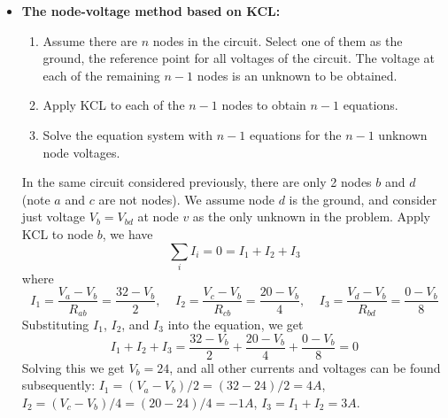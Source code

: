\begin{itemize}
\begin{itemize}
  \item Alternatively, consider the two loop currents $I_a$ and $I_c$ 
    around loops abda and bcdb:
    \begin{eqnarray}
      \sum V_{abda}&=&-32+2(I_a+I_c)+8I_a=0\nonumber\\
      \sum V_{abcda}&=&-32+2(I_a+I_c)+4I_c+20=0\nonumber
    \end{eqnarray}
    i.e.,
    \[
    \left\{ \begin{array}{rrrr} 10I_a&+2I_c&=&32 \\ 2I_a &+6I_c&=&12
    \end{array} \right. 
    \begin{comment}
    \;\;\;\;\;\mbox{i.e.,}\;\;\;\;\;\;
    \left\{ \begin{array}{rrrr} 5I_a&+I_c&=&16 \\ I_a &+3I_c&=&6\end{array} \right. 
    \end{comment}
    \;\;\;\;\;\;\Longrightarrow \;\;\;\;\;
    \left\{ \begin{array}{l}
      I_a=3 \\  I_c=1 \end{array} \right. 
    \]
    and we get $I_1=I_a+I_c=4$ and $I_2=-I_c=-1$, same as the previous 
    results.

  \end{itemize}

\item {\bf The node-voltage method based on KCL:}

  \begin{enumerate} 
  \item Assume there are $n$ nodes in the circuit. Select one of them as
    the ground, the reference point for all voltages of the circuit.
    The voltage at each of the remaining $n-1$ nodes is an unknown to be 
    obtained.
  \item Apply KCL to each of the $n-1$ nodes to obtain $n-1$ equations. 
  \item Solve the equation system with $n-1$ equations for the $n-1$
    unknown node voltages.
  \end{enumerate}


  In the same circuit considered previously, there are only 2 nodes $b$ and
  $d$ (note $a$ and $c$ are not nodes). We assume node $d$ is the ground,
  and consider just voltage $V_b=V_{bd}$ at node $v$ as the only unknown in 
  the problem. Apply KCL to node $b$, we have
  \[
  \sum_i I_i=0=I_1+I_2+I_3	
  \]
  where
  \[
  I_1=\frac{V_a-V_b}{R_{ab}}=\frac{32-V_b}{2},\;\;\;\;
  I_2=\frac{V_c-V_b}{R_{cb}}=\frac{20-V_b}{4},\;\;\;\;
  I_3=\frac{V_d-V_b}{R_{bd}}=\frac{0-V_b}{8}  
  \]
  Substituting $I_1$, $I_2$, and $I_3$ into the equation, we get 
  \[
  I_1+I_2+I_3=\frac{32-V_b}{2}+\frac{20-V_b}{4}+\frac{0-V_b}{8}=0
  \]
  Solving this we get $V_b=24$, and all other currents and voltages can 
  be found subsequently: $I_1=(V_a-V_b)/2=(32-24)/2=4A$, 
  $I_2=(V_c-V_b)/4=(20-24)/4=-1A$, $I_3=I_1+I_2=3A$.


\end{itemize}
